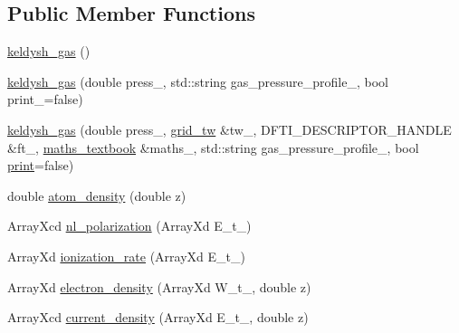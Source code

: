 \subsection*{Public Member Functions}
\begin{DoxyCompactItemize}
\item 
\hyperlink{classkeldysh__gas_a25e559700c04e93efb560db511adbe72}{keldysh\+\_\+gas} ()
\item 
\hyperlink{classkeldysh__gas_a457eec01f8cb23665d6a24c343b29571}{keldysh\+\_\+gas} (double press\+\_\+, std\+::string gas\+\_\+pressure\+\_\+profile\+\_\+, bool print\+\_\+=false)
\item 
\hyperlink{classkeldysh__gas_ac986b9e64f1ce288ad0dfb7bdb00e844}{keldysh\+\_\+gas} (double press\+\_\+, \hyperlink{classgrid__tw}{grid\+\_\+tw} \&tw\+\_\+, D\+F\+T\+I\+\_\+\+D\+E\+S\+C\+R\+I\+P\+T\+O\+R\+\_\+\+H\+A\+N\+D\+LE \&ft\+\_\+, \hyperlink{classmaths__textbook}{maths\+\_\+textbook} \&maths\+\_\+, std\+::string gas\+\_\+pressure\+\_\+profile\+\_\+, bool \hyperlink{classkeldysh__gas_a6c8f0e275da16bbf21f51a8c2a444bf7}{print}=false)
\item 
double \hyperlink{classkeldysh__gas_acfa0604a6f00bce28b72b9a07fb79314}{atom\+\_\+density} (double z)
\item 
Array\+Xcd \hyperlink{classkeldysh__gas_a1cd65d1983cb6c5ff9d04eeb29e94dd5}{nl\+\_\+polarization} (Array\+Xd E\+\_\+t\+\_\+)
\item 
Array\+Xd \hyperlink{classkeldysh__gas_a42dc79816adcae9c25499baa7256ec10}{ionization\+\_\+rate} (Array\+Xd E\+\_\+t\+\_\+)
\item 
Array\+Xd \hyperlink{classkeldysh__gas_a8dddacdfabea4d6c3049088cc868715a}{electron\+\_\+density} (Array\+Xd W\+\_\+t\+\_\+, double z)
\item 
Array\+Xcd \hyperlink{classkeldysh__gas_a7d5f16951d622544d814518a37768411}{current\+\_\+density} (Array\+Xd E\+\_\+t\+\_\+, double z)
\end{DoxyCompactItemize}
